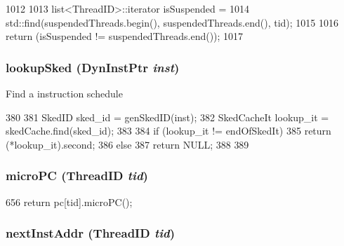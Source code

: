 \begin{DoxyCode}
1012 {
1013   list<ThreadID>::iterator isSuspended =
1014       std::find(suspendedThreads.begin(), suspendedThreads.end(), tid);
1015 
1016     return (isSuspended != suspendedThreads.end());
1017 }
\end{DoxyCode}
\hypertarget{classInOrderCPU_aa8266c7a3d7b7965c585f9826c0d48f4}{
\subsubsection[{lookupSked}]{ lookupSked ({\bf DynInstPtr} {\em inst})}}
\label{classInOrderCPU_aa8266c7a3d7b7965c585f9826c0d48f4}
Find a instruction schedule 


\begin{DoxyCode}
380     {
381         SkedID sked_id = genSkedID(inst);
382         SkedCacheIt lookup_it = skedCache.find(sked_id);
383 
384         if (lookup_it != endOfSkedIt) {
385             return (*lookup_it).second;
386         } else {
387             return NULL;
388         }
389     }
\end{DoxyCode}
\hypertarget{classInOrderCPU_aa295441afc0fa8f449dc1a0cb7c7b994}{
\subsubsection[{microPC}]{ microPC ({\bf ThreadID} {\em tid})}}
\label{classInOrderCPU_aa295441afc0fa8f449dc1a0cb7c7b994}



\begin{DoxyCode}
656 { return pc[tid].microPC(); }
\end{DoxyCode}
\hypertarget{classInOrderCPU_af1caba1f04cf2802d742d1a16b961e79}{
\subsubsection[{nextInstAddr}]{ nextInstAddr ({\bf ThreadID} {\em tid})}}
\label{classInOrderCPU_af1caba1f04cf2802d742d1a16b961e79}



